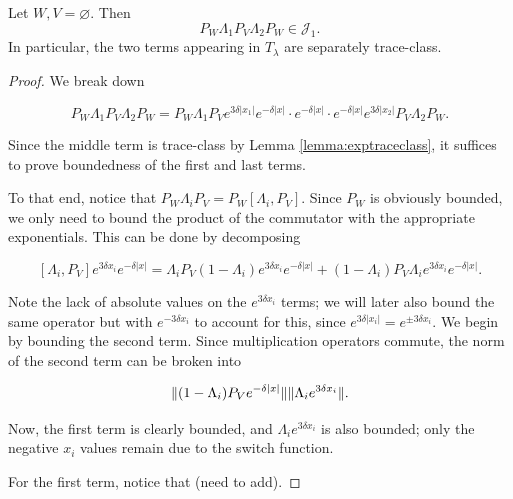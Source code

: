 \documentclass[12pt, letterpaper]{article}
\begin{document}
\begin{lemma}
Let $W,V = \varnothing$. Then
\[P_W \Lambda_1 P_V \Lambda_2 P_W \in \mathcal{J}_1.\]
In particular, the two terms appearing in $T_\lambda$ are separately trace-class.
\label{lemma:seperatelytraceclass}
\end{lemma}
\begin{proof}
We break down

\[P_W \Lambda_1 P_V \Lambda_2 P_W = P_W \Lambda_1 P_V e^{3\delta|x_1|}e^{-\delta|x|} \cdot e^{-\delta|x|} \cdot e^{-\delta|x|}e^{3\delta|x_2|}P_V \Lambda_2 P_W.\]

Since the middle term is trace-class by Lemma \ref{lemma:exptraceclass}, it suffices to prove boundedness of the first and last terms. 




To that end, notice that $P_W \Lambda_i P_V = P_W[\Lambda_i,P_V]$. Since $P_W$ is obviously bounded, we only need to bound the product of the commutator with the appropriate exponentials. This can be done by decomposing

\[[\Lambda_i,P_V]e^{3\delta x_i}e^{-\delta|x|} = \Lambda_i P_V (1-\Lambda_i) e^{3\delta x_i} e^{-\delta|x|} +  (1-\Lambda_i) P_V \Lambda_i e^{3\delta x_i}e^{-\delta|x|}.\]

Note the lack of absolute values on the $e^{3\delta x_i}$ terms; we will later also bound the same operator but with $e^{-3\delta x_i}$ to account for this, since $e^{3\delta |x_i|} = e^{\pm3\delta x_i}$. We begin by bounding the second term. Since multiplication operators commute, the norm of the second term can be broken into

\[\lVert (1-\Lambda_i) P_V e^{-\delta|x|} \rVert\lVert \Lambda_i e^{3\delta x_i} \rVert.\]

Now, the first term is clearly bounded, and $\Lambda_i e^{3\delta x_i}$ is also bounded; only the negative $x_i$ values remain due to the switch function. 

For the first term, notice that (need to add).

\end{proof}
\end{document}
